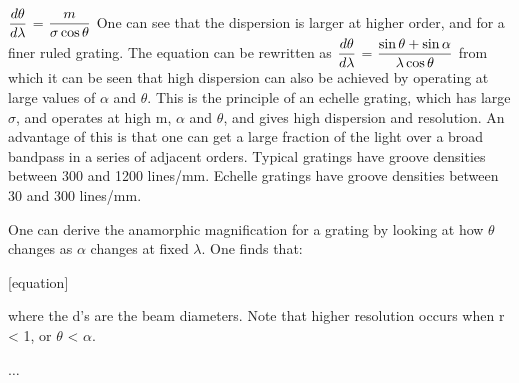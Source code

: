 \documentclass[12pt]{article}
\begin{document}
$\displaystyle {d\theta\over d\lambda}$ = $\displaystyle {m\over
\sigma \cos\theta}$
One can see that the dispersion is larger at higher order, and for a
finer ruled grating. The equation can be rewritten as
$\displaystyle {d\theta\over d\lambda}$ = $\displaystyle {\sin\theta +
\sin \alpha \over \lambda \cos\theta}$
from which it can be seen that high dispersion can also be achieved by
operating at large values of $ \alpha$ and $ \theta$. This is the
principle of an echelle grating, which has large $ \sigma$, and
operates at high m, $ \alpha$ and $ \theta$, and gives high dispersion
and resolution. An advantage of this is that one can get a large
fraction of the light over a broad bandpass in a series of adjacent
orders.
Typical gratings have groove densities between 300 and 1200 lines/mm.
Echelle gratings have groove densities between 30 and 300 lines/mm.

One can derive the anamorphic magnification for a grating by looking
at how $ \theta$ changes as $ \alpha$ changes at fixed $ \lambda$. One
finds that:

[equation]

where the d's are the beam diameters. Note that higher resolution
occurs when r < 1, or  $ \theta$ < $ \alpha$.

$\ldots$
\end{document}
